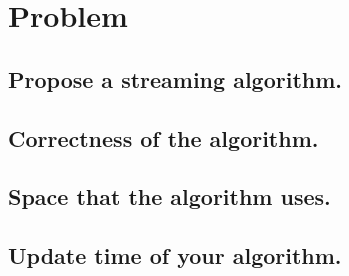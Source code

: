 \documentclass[11pt,a4paper,english]{article}
\begin{document}
    \section{Problem}
      \subsection{Propose a streaming algorithm.}
      \subsection{Correctness of the algorithm.}
      \subsection{Space that the algorithm uses.}
      \subsection{Update time of your algorithm.}
\end{document}
